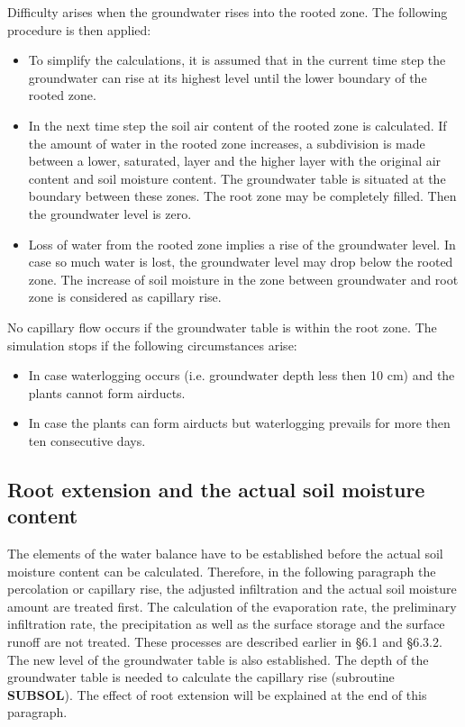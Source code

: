 Difficulty arises when the groundwater rises into the rooted zone. The following procedure is 
then applied:
\begin{itemize}
\item To simplify the calculations, it is assumed that in the current time step the
  groundwater can rise at its highest level until the lower boundary of the rooted
  zone.
\item In the next time step the soil air content of the rooted zone is calculated. If the
  amount of water in the rooted zone increases, a subdivision is made between a
  lower, saturated, layer and the higher layer with the original air content and soil
  moisture content. The {\nobreak}groundwater table is situated at the boundary between these
  zones. The root zone may be completely filled. Then the groundwater level is
  zero.
\item Loss of water from the rooted zone implies a rise of the groundwater level. In
  case so much water is lost, the groundwater level may drop below the rooted
  zone. The increase of soil moisture in the zone between groundwater and root
  zone is considered as capillary rise.
\end{itemize}
 
No capillary flow occurs if the groundwater table is within the root zone. The simulation
stops if the following circumstances arise:
\begin{itemize}
\item In case waterlogging occurs (i.e. groundwater depth less then 10 cm) and the
  plants cannot form airducts.
\item In case the plants can form airducts but waterlogging prevails for more then ten
  consecutive days.
\end{itemize}

\subsection{Root extension and the actual soil moisture content  }

The elements of the water balance have to be established before the actual soil moisture
content can be calculated. Therefore, in the following paragraph the percolation or
capillary rise, the adjusted infiltration and the actual soil moisture amount are treated
first. The calculation of the evaporation rate, the preliminary infiltration rate, the
precipitation as well as the surface storage and the surface runoff are not treated. These
processes are described earlier in \S 6.1 and \S 6.3.2. The new level of the groundwater
table is also established. The depth of the groundwater table is needed to calculate the
capillary rise (subroutine {\bf SUBSOL}). The effect of root extension will be explained at the
end of this paragraph.

